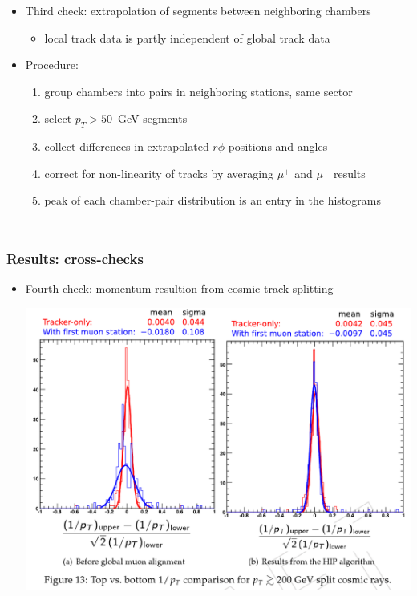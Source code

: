 \documentclass[compress]{beamer}
\begin{document}
\begin{frame}
\begin{columns}
\begin{itemize}
\item Third check: extrapolation of segments between neighboring chambers
\begin{itemize}
\item local track data is partly independent of global track data
\end{itemize}

\item Procedure:
\begin{enumerate}
\item group chambers into pairs in neighboring stations, same sector
\item select $p_T > 50$~GeV segments
\item collect differences in extrapolated $r\phi$ positions and angles
\item correct for non-linearity of tracks by averaging $\mu^+$ and $\mu^-$ results
\item peak of each chamber-pair distribution is an entry in the histograms
\end{enumerate}

\end{itemize}
\end{columns}
\end{frame}

\begin{frame}
\frametitle{Results: cross-checks}

\begin{itemize}
\item Fourth check: momentum resultion from cosmic track splitting

\begin{center}
\includegraphics[width=0.95\linewidth]{momenta.png}
\end{center}
\end{itemize}
\end{frame}
\end{document}
